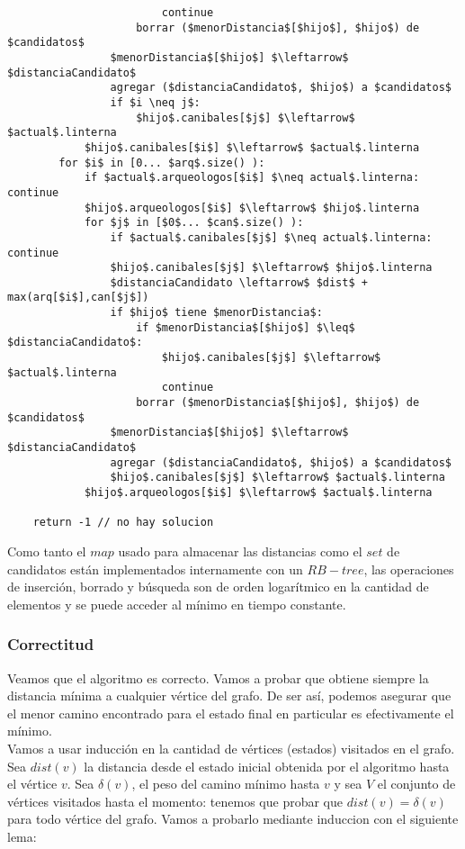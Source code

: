 \begin{lstlisting}
                        continue
                    borrar ($menorDistancia$[$hijo$], $hijo$) de $candidatos$
                $menorDistancia$[$hijo$] $\leftarrow$ $distanciaCandidato$
                agregar ($distanciaCandidato$, $hijo$) a $candidatos$
                if $i \neq j$:
                    $hijo$.canibales[$j$] $\leftarrow$ $actual$.linterna
            $hijo$.canibales[$i$] $\leftarrow$ $actual$.linterna
        for $i$ in [0... $arq$.size() ):
            if $actual$.arqueologos[$i$] $\neq actual$.linterna: continue
            $hijo$.arqueologos[$i$] $\leftarrow$ $hijo$.linterna
            for $j$ in [$0$... $can$.size() ):
                if $actual$.canibales[$j$] $\neq actual$.linterna: continue
                $hijo$.canibales[$j$] $\leftarrow$ $hijo$.linterna
                $distanciaCandidato \leftarrow$ $dist$ + max(arq[$i$],can[$j$])
                if $hijo$ tiene $menorDistancia$:
                    if $menorDistancia$[$hijo$] $\leq$ $distanciaCandidato$:
                        $hijo$.canibales[$j$] $\leftarrow$ $actual$.linterna
                        continue
                    borrar ($menorDistancia$[$hijo$], $hijo$) de $candidatos$
                $menorDistancia$[$hijo$] $\leftarrow$ $distanciaCandidato$
                agregar ($distanciaCandidato$, $hijo$) a $candidatos$
                $hijo$.canibales[$j$] $\leftarrow$ $actual$.linterna
            $hijo$.arqueologos[$i$] $\leftarrow$ $actual$.linterna

    return -1 // no hay solucion

\end{lstlisting}

Como tanto el $map$ usado para almacenar las distancias como el $set$ de candidatos están implementados internamente con un $RB-tree$, las operaciones de inserción, borrado y búsqueda son de orden logarítmico en la cantidad de elementos y se puede acceder al mínimo en tiempo constante.

    \subsubsection{Correctitud}

Veamos que el algoritmo es correcto. Vamos a probar que obtiene siempre la distancia mínima a cualquier vértice del grafo. De ser así, podemos asegurar que el menor camino encontrado para el estado final en particular es efectivamente el mínimo.
\\

Vamos a usar inducción en la cantidad de vértices (estados) visitados en el grafo.
Sea $dist(v)$ la distancia desde el estado inicial obtenida por el algoritmo hasta el vértice $v$. Sea $\delta(v)$, el peso del camino mínimo hasta $v$ y sea $V$ el conjunto de vértices visitados hasta el momento: tenemos que probar que $dist(v) = \delta(v)$ para todo vértice del grafo. Vamos a probarlo mediante induccion con el siguiente lema:
\\

